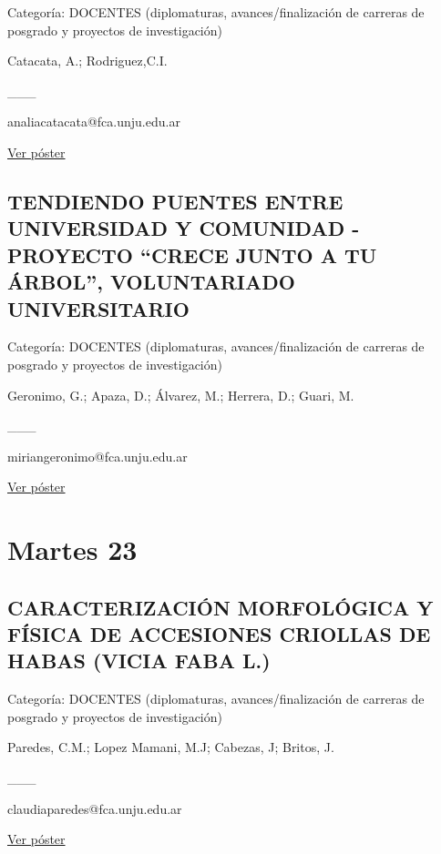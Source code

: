 \documentclass[
  spanish,
  letterpaper,
  DIV=11,
  numbers=noendperiod]{scrreprt}
\begin{document}
Categoría: DOCENTES (diplomaturas, avances/finalización de carreras de
posgrado y proyectos de investigación)

Catacata, A.; Rodriguez,C.I.

\_\_\_

analiacatacata@fca.unju.edu.ar

\href{https://drive.google.com/open?id=1ofjueuOTLta4a_scththhoUoZYPZttzC}{Ver
póster}

\section{TENDIENDO PUENTES ENTRE UNIVERSIDAD Y COMUNIDAD - PROYECTO
``CRECE JUNTO A TU ÁRBOL'', VOLUNTARIADO
UNIVERSITARIO}\label{tendiendo-puentes-entre-universidad-y-comunidad---proyecto-crece-junto-a-tu-uxe1rbol-voluntariado-universitario}

Categoría: DOCENTES (diplomaturas, avances/finalización de carreras de
posgrado y proyectos de investigación)

Geronimo, G.; Apaza, D.; Álvarez, M.; Herrera, D.; Guari, M.

\_\_\_

miriangeronimo@fca.unju.edu.ar

\href{https://drive.google.com/open?id=1ltJ15W4aJRmcUmom2zAnE2IGiM4_QQn5}{Ver
póster}


\chapter{Martes 23}\label{martes-23-1}

\section{CARACTERIZACIÓN MORFOLÓGICA Y FÍSICA DE ACCESIONES CRIOLLAS DE
HABAS (VICIA FABA
L.)}\label{caracterizaciuxf3n-morfoluxf3gica-y-fuxedsica-de-accesiones-criollas-de-habas-vicia-faba-l.}

Categoría: DOCENTES (diplomaturas, avances/finalización de carreras de
posgrado y proyectos de investigación)

Paredes, C.M.; Lopez Mamani, M.J; Cabezas, J; Britos, J.

\_\_\_

claudiaparedes@fca.unju.edu.ar

\href{https://drive.google.com/open?id=1qGIdPVNW9a_U0NVpnTmnlZwCjbZOH9gJ}{Ver
póster}
\end{document}
